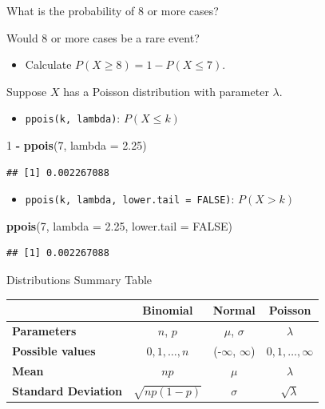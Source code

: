 \documentclass[ignorenonframetext,aspectratio=169]{beamer}
\newenvironment{Shaded}{\begin{snugshade}}{\end{snugshade}}
\newcommand{\KeywordTok}[1]{\textcolor[rgb]{0.13,0.29,0.53}{\textbf{#1}}}
\newcommand{\DataTypeTok}[1]{\textcolor[rgb]{0.13,0.29,0.53}{#1}}
\newcommand{\DecValTok}[1]{\textcolor[rgb]{0.00,0.00,0.81}{#1}}
\newcommand{\FloatTok}[1]{\textcolor[rgb]{0.00,0.00,0.81}{#1}}
\newcommand{\StringTok}[1]{\textcolor[rgb]{0.31,0.60,0.02}{#1}}
\newcommand{\OtherTok}[1]{\textcolor[rgb]{0.56,0.35,0.01}{#1}}
\newcommand{\OperatorTok}[1]{\textcolor[rgb]{0.81,0.36,0.00}{\textbf{#1}}}
\newcommand{\NormalTok}[1]{#1}
\providecommand{\tightlist}{%
  \setlength{\itemsep}{0pt}\setlength{\parskip}{0pt}}
\begin{document}
\begin{frame}[fragile]{What is the probability of 8 or more cases?}

Would 8 or more cases be a rare event?

\begin{itemize}
\tightlist
\item
  Calculate \(P(X \geq 8) = 1 - P(X \leq 7)\).
\end{itemize}

Suppose \(X\) has a Poisson distribution with parameter \(\lambda\).

\footnotesize

\begin{itemize}
\tightlist
\item
  \texttt{ppois(k, lambda)}: \(P(X \leq k)\)
\end{itemize}

\begin{Shaded}
\begin{Highlighting}[]
\DecValTok{1} \OperatorTok{-}\StringTok{ }\KeywordTok{ppois}\NormalTok{(}\DecValTok{7}\NormalTok{, }\DataTypeTok{lambda =} \FloatTok{2.25}\NormalTok{)}
\end{Highlighting}
\end{Shaded}

\begin{verbatim}
## [1] 0.002267088
\end{verbatim}

\begin{itemize}
\tightlist
\item
  \texttt{ppois(k, lambda, lower.tail = FALSE)}: \(P(X > k)\)
\end{itemize}

\begin{Shaded}
\begin{Highlighting}[]
\KeywordTok{ppois}\NormalTok{(}\DecValTok{7}\NormalTok{, }\DataTypeTok{lambda =} \FloatTok{2.25}\NormalTok{, }\DataTypeTok{lower.tail =} \OtherTok{FALSE}\NormalTok{)}
\end{Highlighting}
\end{Shaded}

\begin{verbatim}
## [1] 0.002267088
\end{verbatim}

\end{frame}

\begin{frame}{Distributions Summary Table}

\begin{tabular}{l|ccc} 
  & \textbf{Binomial} & \textbf{Normal} & \textbf{Poisson} \\ \hline
  \textbf{Parameters} & $n$, $p$  & $\mu$,  $\sigma$ & $\lambda$ \\ 
  \textbf{Possible values} & $0,1,\ldots,n$ & (-$\infty$, $\infty$) & $0,1,\ldots,\infty$ \\
  \textbf{Mean} &  $np$  & $\mu$ & $\lambda$ \\ 
  \textbf{Standard Deviation} & $\sqrt{np(1-p)}$ & $\sigma$ & $\sqrt{\lambda}$ \\ 
\end{tabular}

\end{frame}
\end{document}

